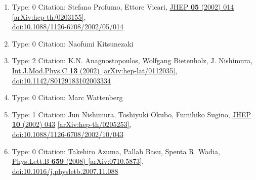 \documentclass[a4paper,10pt]{article}
\begin{document}
\begin{enumerate}
\begin{enumerate}
  \item Type: 0 Citation: Stefano Profumo, Ettore Vicari, \href{https://www.doi.org/10.1088/1126-6708/2002/05/014}{JHEP {\bf 05} (2002) 014}  \href{https://arxiv.org/abs/hep-th/0203155}{[arXiv:hep-th/0203155]},\\\href{https://www.doi.org/10.1088/1126-6708/2002/05/014}{doi:10.1088/1126-6708/2002/05/014}
  \item Type: 0 Citation: Naofumi Kitsunezaki
  \item Type: 2 Citation: K.N. Anagnostopoulos, Wolfgang Bietenholz, J. Nishimura, \href{https://www.doi.org/10.1142/S0129183102003334}{Int.J.Mod.Phys.C {\bf 13} (2002) }  \href{https://arxiv.org/abs/hep-lat/0112035}{[arXiv:hep-lat/0112035]},\\\href{https://www.doi.org/10.1142/S0129183102003334}{doi:10.1142/S0129183102003334}
  \item Type: 0 Citation: Marc Wattenberg
  \item Type: 1 Citation: Jun Nishimura, Toshiyuki Okubo, Fumihiko Sugino, \href{https://www.doi.org/10.1088/1126-6708/2002/10/043}{JHEP {\bf 10} (2002) 043}  \href{https://arxiv.org/abs/hep-th/0205253}{[arXiv:hep-th/0205253]},\\\href{https://www.doi.org/10.1088/1126-6708/2002/10/043}{doi:10.1088/1126-6708/2002/10/043}
  \item Type: 0 Citation: Takehiro Azuma, Pallab Basu, Spenta R. Wadia, \href{https://www.doi.org/10.1016/j.physletb.2007.11.088}{Phys.Lett.B {\bf 659} (2008) }  \href{https://arxiv.org/abs/0710.5873}{[arXiv:0710.5873]},\\\href{https://www.doi.org/10.1016/j.physletb.2007.11.088}{doi:10.1016/j.physletb.2007.11.088}

\end{enumerate}
\end{enumerate}
\end{document}

